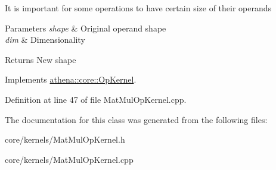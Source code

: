 It is important for some operations to have certain size of their operands 
\begin{DoxyParams}{Parameters}
{\em shape} & Original operand shape \\
\hline
{\em dim} & Dimensionality \\
\hline
\end{DoxyParams}
\begin{DoxyReturn}{Returns}
New shape 
\end{DoxyReturn}


Implements \mbox{\hyperlink{classathena_1_1core_1_1_op_kernel_a762e541463ffd089b47a8e6755c30fe1}{athena\+::core\+::\+Op\+Kernel}}.



Definition at line 47 of file Mat\+Mul\+Op\+Kernel.\+cpp.



The documentation for this class was generated from the following files\+:\begin{DoxyCompactItemize}
\item 
core/kernels/Mat\+Mul\+Op\+Kernel.\+h\item 
core/kernels/Mat\+Mul\+Op\+Kernel.\+cpp\end{DoxyCompactItemize}
